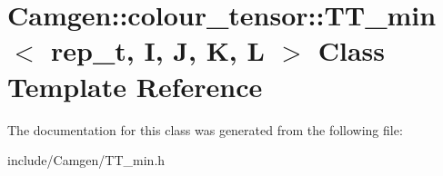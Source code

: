 \hypertarget{a00551}{}\section{Camgen\+:\+:colour\+\_\+tensor\+:\+:T\+T\+\_\+min$<$ rep\+\_\+t, I, J, K, L $>$ Class Template Reference}
\label{a00551}


The documentation for this class was generated from the following file\+:\begin{DoxyCompactItemize}
\item 
include/\+Camgen/T\+T\+\_\+min.\+h\end{DoxyCompactItemize}
